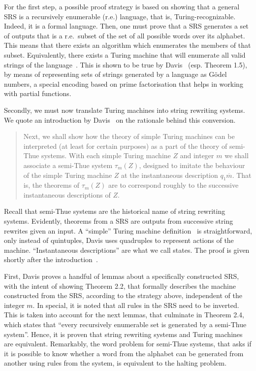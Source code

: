 \documentclass[12pt]{article}
\begin{document}
For the first step, a possible proof strategy is based on showing that a
general SRS is a recursively enumerable (r.e.) language, that is,
Turing-recognizable. Indeed, it is a formal language. Then, one must prove that
a SRS generates a set of outputs that is a r.e.\ subset of the set of all
possible words over its alphabet. This means that there exists an algorithm
which enumerates the members of that subset. Equivalently, there exists a
Turing machine that will enumerate all valid strings of the
language~\cite[Theorem 3.21]{Sipser:book:2012}. This is shown to be true by
Davis~\cite[pp. 84--86]{Davis:book:1958} (esp. Theorem 1.5), by means of
representing sets of strings generated by a language as Gödel numbers, a
special encoding based on prime factorisation that helps in working with
partial functions.

Secondly, we must now translate Turing machines into string rewriting systems.
We quote an introduction by Davis~\cite[Sec. 6.2]{Davis:book:1958} on the
rationale behind this conversion.

\begin{quote}
    Next, we shall show how the theory of simple Turing machines can be
    interpreted (at least for certain purposes) as a part of the theory of
    semi-Thue systems. With each simple Turing machine $Z$ and integer $m$ we
    shall associate a semi-Thue system $\tau_{m}(Z)$, designed to imitate the
    behaviour of the simple Turing machine $Z$ at the instantaneous description
    $q_{1}\overline{m}$. That is, the theorems of $\tau_{m}(Z)$ are to
    correspond roughly to the successive instantaneous descriptions of $Z$.
\end{quote}

Recall that semi-Thue systems are the historical name of string rewriting
systems. Evidently, theorems from a SRS are outputs from successive string
rewrites given an input. A ``simple'' Turing machine definition~\cite[Sec. 1.1,
Def. 1.3]{Davis:book:1958} is straightforward, only instead of quintuples,
Davis uses quadruples to represent actions of the machine. ``Instantaneous
descriptions'' are what we call states. The proof is given shortly after the
introduction~\cite[pp. 88--93]{Davis:book:1958}.

First, Davis proves a handful of lemmas about a specifically constructed SRS,
with the intent of showing Theorem 2.2, that formally describes the machine
constructed from the SRS, according to the strategy above, independent of the
integer $m$. In special, it is noted that all rules in the SRS need to be
inverted. This is taken into account for the next lemmas, that culminate in
Theorem 2.4, which states that ``every recursively enumerable set is generated
by a semi-Thue system''. Hence, it is proven that string rewriting systems and
Turing machines are equivalent. Remarkably, the word problem for semi-Thue
systems, that asks if it is possible to know whether a word from the alphabet
can be generated from another using rules from the system, is equivalent to the
halting problem.
\end{document}
